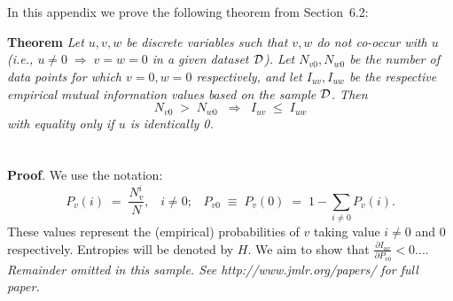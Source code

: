 \documentclass[twoside,11pt]{article}
\newcommand{\dataset}{{\cal D}}
\newcommand{\fracpartial}[2]{\frac{\partial #1}{\partial  #2}}
\begin{document}
\newpage

\appendix
\section{}
\label{app:theorem}



In this appendix we prove the following theorem from
Section~6.2:

\noindent
{\bf Theorem} {\it Let $u,v,w$ be discrete variables such that $v, w$ do
not co-occur with $u$ (i.e., $u\neq0\;\Rightarrow \;v=w=0$ in a given
dataset $\dataset$). Let $N_{v0},N_{w0}$ be the number of data points for
which $v=0, w=0$ respectively, and let $I_{uv},I_{uw}$ be the
respective empirical mutual information values based on the sample
$\dataset$. Then
\[
	N_{v0} \;>\; N_{w0}\;\;\Rightarrow\;\;I_{uv} \;\leq\;I_{uw}
\]
with equality only if $u$ is identically 0.} \hfill\BlackBox

\section{}

\noindent
{\bf Proof}. We use the notation:
\[
P_v(i) \;=\;\frac{N_v^i}{N},\;\;\;i \neq 0;\;\;\;
P_{v0}\;\equiv\;P_v(0)\; = \;1 - \sum_{i\neq 0}P_v(i).
\]
These values represent the (empirical) probabilities of $v$
taking value $i\neq 0$ and 0 respectively.  Entropies will be denoted
by $H$. We aim to show that $\fracpartial{I_{uv}}{P_{v0}} < 0$....\\

{\noindent \em Remainder omitted in this sample. See http://www.jmlr.org/papers/ for full paper.}


\vskip 0.2in

\end{document}
